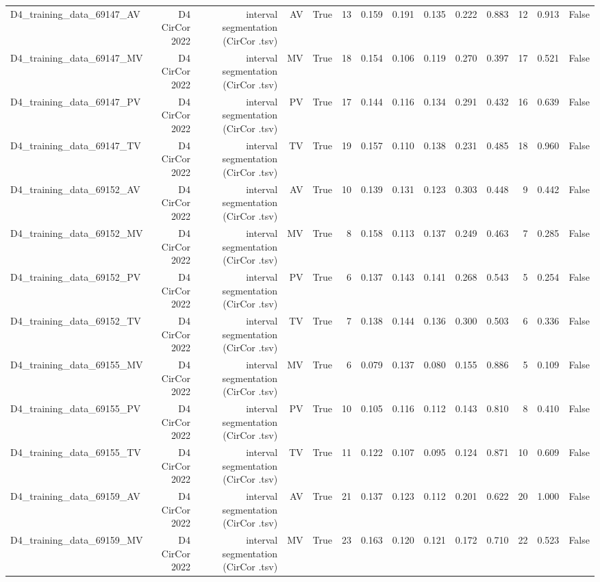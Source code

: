 \begin{table}[htbp]
\begin{tabular}{lrrrrrrrrrrrrr}
    D4\_training\_data\_69147\_AV & D4 CirCor 2022 & interval segmentation (CirCor .tsv) & AV & True & 13 & 0.159 & 0.191 & 0.135 & 0.222 & 0.883 & 12 & 0.913 & False \\
    D4\_training\_data\_69147\_MV & D4 CirCor 2022 & interval segmentation (CirCor .tsv) & MV & True & 18 & 0.154 & 0.106 & 0.119 & 0.270 & 0.397 & 17 & 0.521 & False \\
    D4\_training\_data\_69147\_PV & D4 CirCor 2022 & interval segmentation (CirCor .tsv) & PV & True & 17 & 0.144 & 0.116 & 0.134 & 0.291 & 0.432 & 16 & 0.639 & False \\
    D4\_training\_data\_69147\_TV & D4 CirCor 2022 & interval segmentation (CirCor .tsv) & TV & True & 19 & 0.157 & 0.110 & 0.138 & 0.231 & 0.485 & 18 & 0.960 & False \\
    D4\_training\_data\_69152\_AV & D4 CirCor 2022 & interval segmentation (CirCor .tsv) & AV & True & 10 & 0.139 & 0.131 & 0.123 & 0.303 & 0.448 & 9 & 0.442 & False \\
    D4\_training\_data\_69152\_MV & D4 CirCor 2022 & interval segmentation (CirCor .tsv) & MV & True & 8 & 0.158 & 0.113 & 0.137 & 0.249 & 0.463 & 7 & 0.285 & False \\
    D4\_training\_data\_69152\_PV & D4 CirCor 2022 & interval segmentation (CirCor .tsv) & PV & True & 6 & 0.137 & 0.143 & 0.141 & 0.268 & 0.543 & 5 & 0.254 & False \\
    D4\_training\_data\_69152\_TV & D4 CirCor 2022 & interval segmentation (CirCor .tsv) & TV & True & 7 & 0.138 & 0.144 & 0.136 & 0.300 & 0.503 & 6 & 0.336 & False \\
    D4\_training\_data\_69155\_MV & D4 CirCor 2022 & interval segmentation (CirCor .tsv) & MV & True & 6 & 0.079 & 0.137 & 0.080 & 0.155 & 0.886 & 5 & 0.109 & False \\
    D4\_training\_data\_69155\_PV & D4 CirCor 2022 & interval segmentation (CirCor .tsv) & PV & True & 10 & 0.105 & 0.116 & 0.112 & 0.143 & 0.810 & 8 & 0.410 & False \\
    D4\_training\_data\_69155\_TV & D4 CirCor 2022 & interval segmentation (CirCor .tsv) & TV & True & 11 & 0.122 & 0.107 & 0.095 & 0.124 & 0.871 & 10 & 0.609 & False \\
    D4\_training\_data\_69159\_AV & D4 CirCor 2022 & interval segmentation (CirCor .tsv) & AV & True & 21 & 0.137 & 0.123 & 0.112 & 0.201 & 0.622 & 20 & 1.000 & False \\
    D4\_training\_data\_69159\_MV & D4 CirCor 2022 & interval segmentation (CirCor .tsv) & MV & True & 23 & 0.163 & 0.120 & 0.121 & 0.172 & 0.710 & 22 & 0.523 & False \\

\end{tabular}
\end{table}
